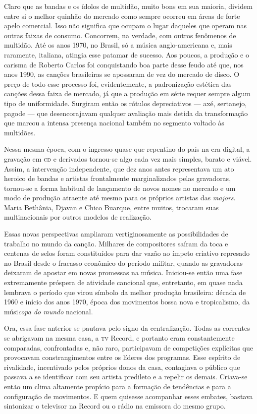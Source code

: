 Claro que as bandas e os ídolos de multidão, muito bons em sua maioria,
dividem entre si o melhor quinhão do mercado como sempre ocorreu em
áreas de forte apelo comercial. Isso não significa que ocupam o lugar
daqueles que operam nas outras faixas de consumo. Concorrem, na verdade,
com outros fenômenos de multidão. Até os anos 1970, no Brasil, só a
música anglo-americana e, mais raramente, italiana, atingia esse
patamar de sucesso. Aos poucos, a produção e o carisma de Roberto Carlos
foi conquistando boa parte desse feudo até que, nos anos 1990, as
canções brasileiras se apossaram de vez do mercado de disco. O preço de
todo esse processo foi, evidentemente, a padronização estética das
canções dessa faixa de mercado, já que a produção em série requer sempre
algum tipo de uniformidade. Surgiram então os rótulos depreciativos ---
axé, sertanejo, pagode --- que desencorajavam qualquer avaliação mais
detida da transformação que marcou a intensa presença nacional também no
segmento voltado às multidões.

Nessa mesma época, com o ingresso quase que repentino do país na era
digital, a gravação em \textsc{cd} e derivados tornou-se algo cada vez mais
simples, barato e viável. Assim, a intervenção independente, que dez
anos antes representava um ato heroico de bandas e artistas frontalmente
marginalizados pelas gravadoras, tornou-se a forma habitual de
lançamento de novos nomes no mercado e um modo de produção atraente até
mesmo para os próprios artistas das \emph{majors}. Maria Bethânia,
Djavan e Chico Buarque, entre muitos, trocaram suas multinacionais por
outros modelos de realização.

Essas novas perspectivas ampliaram vertiginosamente as possibilidades de
trabalho no mundo da canção. Milhares de compositores saíram da toca e
centenas de selos foram constituídos para dar vazão ao ímpeto criativo
represado no Brasil desde o fracasso econômico do período militar,
quando as gravadoras deixaram de apostar em novas promessas na música.
Iniciou-se então uma fase extremamente próspera de atividade cancional
que, entretanto, em quase nada lembrava o período que virou símbolo da
melhor produção brasileira: década de 1960 e início dos anos 1970, época
dos movimentos bossa nova e tropicalismo, da músi\textit{copa do mundo}
nacional.

Ora, essa fase anterior se pautava pelo signo da centralização. Todas as
correntes se abrigavam na mesma casa, a \textsc{tv} Record, e portanto eram
constantemente comparadas, confrontadas e, não raro, participavam de
competições explícitas que provocavam constrangimentos entre os líderes
dos programas. Esse espírito de rivalidade, incentivado pelos próprios
donos da casa, contagiava o público que passava a se identificar com seu
artista predileto e a repelir os demais. Criava-se então um clima
altamente propício para a formação de tendências e para a configuração
de movimentos. E quem quisesse acompanhar esses embates, bastava
sintonizar o televisor na Record ou o rádio na emissora do mesmo grupo.

